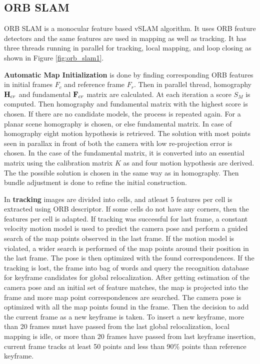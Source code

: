 \subsection{ORB SLAM}

ORB SLAM \cite{7219438} is a monocular feature based vSLAM algorithm. It uses ORB feature detectors and the same features are used in mapping as well as tracking. It has three threads running in parallel for tracking, local mapping, and loop closing as shown in Figure \ref{fig:orb_slam1}.

\textbf{Automatic Map Initialization} is done by finding corresponding ORB features in initial frames $F_c$ and reference frame $F_r$. Then in parallel thread, homography ${\bf H}_{cr}$ and fundamental ${\bf F}_{cr}$ matrix are calculated. At each iteration a score $S_M$ is computed. Then homography and fundamental matrix with the highest score is chosen. If there are no candidate models, the process is repeated again. For a planar scene homography is chosen, or else fundamental matrix. In case of homography eight motion hypothesis is retrieved. The solution with most points seen in parallax in front of both the camera with low re-projection error is chosen. In the case of the fundamental matrix, it is converted into an essential matrix using the calibration matrix $K$ as and four motion hypothesis are derived. The the possible solution is chosen in the same way as in homography. Then bundle adjustment is done to refine the initial construction.

In \textbf{tracking} images are divided into cells, and atleast 5 features per cell is extracted using ORB descriptor. If some cells do not have any corners, then the features per cell is adapted. If tracking was successful for last frame, a constant velocity motion model is used to predict the camera pose and perform a guided search of the map points observed in the last frame. If the motion model is violated, a wider search is performed of the map points around their position in the last frame. The pose is then optimized with the found correspondences. If the tracking is lost, the frame into bag of words and query the recognition database for keyframe candidates for global relocalization. After getting estimation of the camera pose and an initial set of feature matches, the map is projected into the frame and more map point correspondences are searched. The camera pose is optimized with all the map points found in the frame. Then the decision to add the current frame as a new keyframe is taken. To insert a new keyframe, more than 20 frames must have passed from the last global relocalization, local mapping is idle, or more than 20 frames have passed from last keyframe insertion, current frame tracks at least 50 points and less than 90\% points than reference keyframe.

